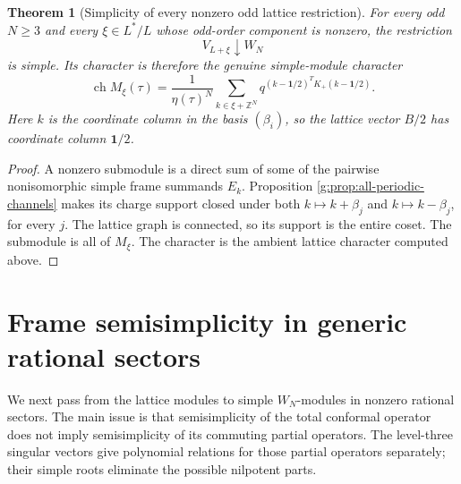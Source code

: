 \documentclass[11pt,a4paper]{article}
\numberwithin{equation}{section}
\newtheorem{theorem}{Theorem}[section]
\theoremstyle{definition}\newtheorem{definition}[theorem]{Definition}
\theoremstyle{remark}\newtheorem{remark}[theorem]{Remark}
\begin{document}
\begin{theorem}[Simplicity of every nonzero odd lattice restriction]
\label{g:thm:periodic-simple}
For every odd $N\ge3$ and every $\xi\in L^*/L$ whose odd-order
component is nonzero, the restriction
\[
 V_{L+\xi}\downarrow W_N
\]
is simple. Its character is therefore the genuine simple-module
character
\[
 \operatorname{ch}M_\xi(\tau)
  =\frac1{\eta(\tau)^N}
    \sum_{k\in\xi+\mathbb Z^N}
     q^{(k-\mathbf1/2)^TK_+(k-\mathbf1/2)}.
\]
Here $k$ is the coordinate column in the basis $(\beta_i)$, so the
lattice vector $B/2$ has coordinate column $\mathbf1/2$.
\end{theorem}
\begin{proof}
A nonzero submodule is a direct sum of some of the pairwise
nonisomorphic simple frame summands $E_k$. Proposition
\ref{g:prop:all-periodic-channels} makes its charge support closed
under both $k\mapsto k+\beta_j$ and $k\mapsto k-\beta_j$, for
every $j$. The lattice graph is connected, so its support is the
entire coset. The submodule is all of $M_\xi$. The character is
the ambient lattice character computed above.
\end{proof}

\section{Frame semisimplicity in generic rational sectors}
\label{g:sec:generic-frame-semisimple}

We next pass from the lattice modules to simple $W_N$-modules in
nonzero rational sectors.  The main issue is that semisimplicity of
the total conformal operator does not imply semisimplicity of its
commuting partial operators.  The level-three singular vectors give
polynomial relations for those partial operators separately; their
simple roots eliminate the possible nilpotent parts.
\end{document}
